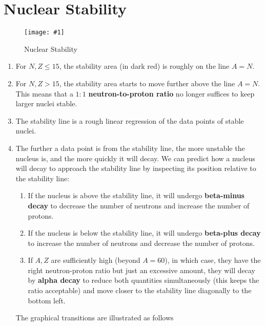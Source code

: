 \documentclass[a4paper,12pt]{article}
\let\oldsection\section
\renewcommand\section{\clearpage\oldsection}
\newcommand{\img}[4]{\begin{center}
  \begin{figure}[H]
    \centering
    \texttt{[image: \#1]}
    \caption{#3}
    \label{fig:#4}
  \end{figure}
\end{center}}
\begin{document}
\section{Nuclear Stability}

\img{stability graph.png}{0.8}{Nuclear Stability}{stability}

\begin{enumerate}
  \item For $N, Z \le 15$, the stability area (in dark red) is roughly on the line $A = N$.
  \item For $N, Z > 15$, the stability area starts to move further above the line $A = N$. This means that a $1:1$ \textbf{neutron-to-proton ratio} no longer suffices to keep larger nuclei stable.
  \item The stability line is a rough linear regression of the data points of stable nuclei.
  \item The further a data point is from the stability line, the more unstable the nucleus is, and the more quickly it will decay. We can predict how a nucleus will decay to approach the stability line by inspecting its position relative to the stability line:
        \begin{enumerate}
          \item If the nucleus is above the stability line, it will undergo \textbf{beta-minus decay} to decrease the number of neutrons and increase the number of protons.
          \item If the nucleus is below the stability line, it will undergo \textbf{beta-plus decay} to increase the number of neutrons and decrease the number of protons.
          \item If $A, Z$ are sufficiently high (beyond $A = 60$), in which case, they have the right neutron-proton ratio but just an excessive amount, they will decay by \textbf{alpha decay} to reduce both quantities simultaneously (this keeps the ratio acceptable) and move closer to the stability line diagonally to the bottom left.
        \end{enumerate}
        The graphical transitions are illustrated as follows


\end{enumerate}
\end{document}
